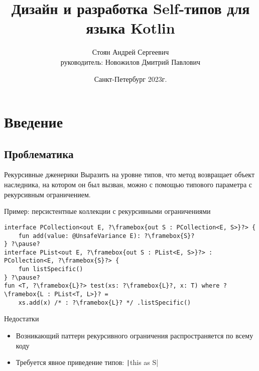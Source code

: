 \documentclass[aspectratio=169,usenames,dvipsnames]{beamer}
\author[Андрей Стоян]{Стоян Андрей Сергеевич\\ {\footnotesize руководитель:} Новожилов Дмитрий Павлович}
\institute[ИТМО/SE]{Университет ИТМО\\Разработка программного обеспечения/Software engineering}
\title[Дизайн и разработка Self-типов для языка Kotlin]{Дизайн и разработка Self-типов для языка Kotlin}
\date{Санкт-Петербург 2023г.}
\begin{document}
    \maketitle



    \section{Введение}

    \subsection{Проблематика}

    \begin{frame}[fragile]{Рекурсивные дженерики}
        Выразить на уровне типов, что метод возвращает объект наследника, на котором он был вызван, можно с помощью типового параметра с рекурсивным ограничением.
        \pause
        \begin{block}{Пример: персистентные коллекции с рекурсивными ограничениями}
            \begin{verbatim}
interface PCollection<out E, ?\framebox{out S : PCollection<E, S>}?> {
    fun add(value: @UnsafeVariance E): ?\framebox{S}?
} ?\pause?
interface PList<out E, ?\framebox{out S : PList<E, S>}?> : PCollection<E, ?\framebox{S}?> {
    fun listSpecific()
} ?\pause?
fun <T, ?\framebox{L}?> test(xs: ?\framebox{L}?, x: T) where ?\framebox{L : PList<T, L>}? =
    xs.add(x) /* : ?\framebox{L}? */ .listSpecific()
            \end{verbatim}
        \end{block}
        \pause
        \begin{block}{Недостатки}
            \begin{itemize}
                \item Возникающий паттерн рекурсивного ограничения распространяется по всему коду
                \item Требуется явное приведение типов: \texttt|this as S|
            \end{itemize}
        \end{block}
    \end{frame}
\end{document}
